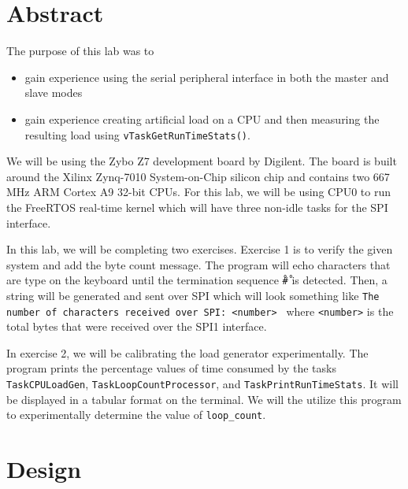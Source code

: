 \documentclass[11pt, letterpaper, titlepage]{article}
\title{\textbf{\Huge{ 
\begin{center}
ECE 315 Lab 3%
\end{center} 
}}}
\author{Lora Ma \\ Benjamin Kong \\ \\ECE 315 Lab Section H41}
\begin{document}
\maketitle
\thispagestyle{empty}
\tableofcontents 
\newpage
{}

\section{Abstract}
The purpose of this lab was to 
\begin{itemize}
  \item gain experience using the serial peripheral interface in both the master and slave modes
  \item gain experience creating artificial load on a CPU and then measuring the resulting load using \texttt{vTaskGetRunTimeStats()}.
\end{itemize}
We will be using the Zybo Z7 development board by Digilent. The board is built around the Xilinx Zynq-7010 System-on-Chip silicon chip and contains two 667 MHz ARM Cortex A9 32-bit CPUs. For this lab, we will be using CPU0 to run the FreeRTOS real-time kernel which will have three non-idle tasks for the SPI interface. 

In this lab, we will be completing two exercises. Exercise 1 is to verify the given system and add the byte count message. The program will echo characters that are type on the keyboard until the termination sequence \texttt{\r#\r} is detected. Then, a string will be generated and sent over SPI which will look something like \texttt{The number of characters received over SPI: <number> \n} where \texttt{<number>} is the total bytes that were received over the SPI1 interface.

In exercise 2, we will be calibrating the load generator experimentally. The program prints the percentage values of time consumed by the tasks \texttt{TaskCPULoadGen}, \texttt{TaskLoopCountProcessor}, and \texttt{TaskPrintRunTimeStats}. It will be displayed in a tabular format on the terminal. We will the utilize this program to experimentally determine the value of \texttt{loop_count}. 

\section{Design}
\end{document}
